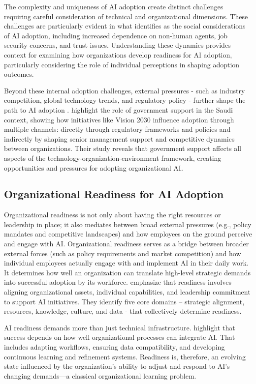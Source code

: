 The complexity and uniqueness of AI adoption create distinct challenges requiring careful consideration of technical and organizational dimensions. These challenges are particularly evident in what \cite{Cubric2020} identifies as the social considerations of AI adoption, including increased dependence on non-human agents, job security concerns, and trust issues. Understanding these dynamics provides context for examining how organizations develop readiness for AI adoption, particularly considering the role of individual perceptions in shaping adoption outcomes.

Beyond these internal adoption challenges, external pressures - such as industry competition, global technology trends, and regulatory policy - further shape the path to AI adoption \citep{Yang2024}. \cite{Felemban2024} highlight the role of government support in the Saudi context, showing how initiatives like Vision 2030 influence adoption through multiple channels: directly through regulatory frameworks and policies and indirectly by shaping senior management support and competitive dynamics between organizations. Their study reveals that government support affects all aspects of the technology-organization-environment framework, creating opportunities and pressures for adopting organizational AI.

\subsection{Organizational Readiness for AI Adoption}


Organizational readiness is not only about having the right resources or leadership in place; it also mediates between broad external pressures (e.g., policy mandates and competitive landscapes) and how employees on the ground perceive and engage with AI. Organizational readiness serves as a bridge between broader external forces (such as policy requirements and market competition) and how individual employees actually engage with and implement AI in their daily work. It determines how well an organization can translate high-level strategic demands into successful adoption by its workforce. \cite{Johnk2021} emphasize that readiness involves aligning organizational assets, individual capabilities, and leadership commitment to support AI initiatives. They identify five core domains – strategic alignment, resources, knowledge, culture, and data - that collectively determine readiness.

AI readiness demands more than just technical infrastructure. \cite{Heimberger2024} highlight that success depends on how well organizational processes can integrate AI. That includes adapting workflows, ensuring data compatibility, and developing continuous learning and refinement systems. Readiness is, therefore, an evolving state influenced by the organization's ability to adjust and respond to AI's changing demands—a classical organizational learning problem.


